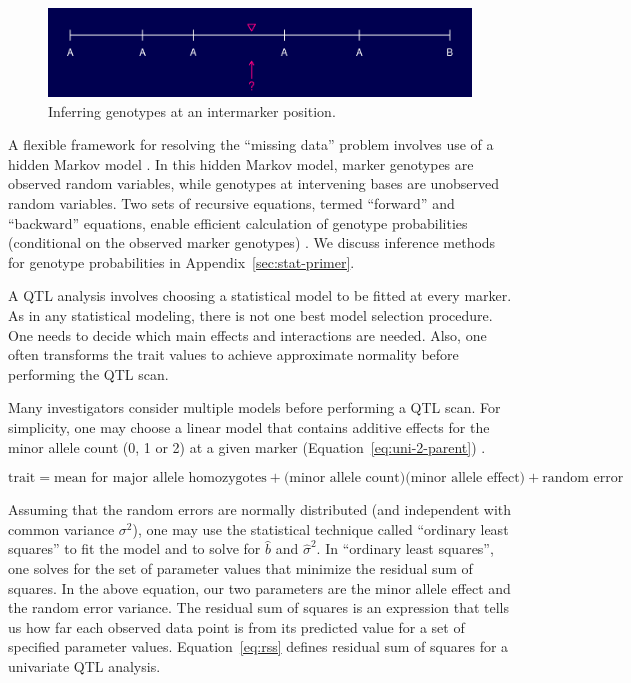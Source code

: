 \documentclass[oneside]{book}\usepackage[]{graphicx}\usepackage[]{color}
\begin{document}
\begin{figure}
\includegraphics[width = \textwidth]{figs/genoprob1.pdf}
\caption{Inferring genotypes at an intermarker position.}\label{fig:genoprob1}
\end{figure}




A flexible framework for resolving the ``missing data'' problem involves use of a
hidden Markov model \citep{broman2009guide, broman2006use}. 
In this hidden Markov model, marker genotypes are observed random variables, 
while genotypes at intervening bases are unobserved random variables. 
Two sets of recursive equations, termed ``forward'' and ``backward'' equations,
enable efficient calculation of genotype probabilities
(conditional on the observed marker genotypes) \citep{baum1970maximization}.
We discuss inference methods for genotype probabilities in Appendix~\ref{sec:stat-primer}.




A QTL analysis involves choosing a statistical model to be fitted at every marker. 
As in any statistical modeling, there is not one best model selection procedure.
One needs to decide which main effects and interactions are needed.
Also, one often transforms the trait values to achieve approximate normality before performing the QTL scan. 

Many investigators consider multiple models before performing a QTL scan.
For simplicity, one may choose a linear model that contains additive effects for
the  minor allele count (0, 1 or 2) at a given marker (Equation~\ref{eq:uni-2-parent}) \citep{martinez1992estimating,haley1992simple}.

\begin{equation}
\text{trait} = \text{mean for major allele homozygotes} + \text{(minor allele count)}\text{(minor allele effect)} + \text{random error}
\label{eq:uni-2-parent}
\end{equation}

Assuming that the random errors are normally distributed (and independent with common
variance $\sigma^2$), one may use the statistical technique called ``ordinary least squares''
to fit the model and to solve for $\hat b$ and $\hat \sigma^2$.
In ``ordinary least squares'', one solves for the set of parameter values that
minimize the residual sum of squares.
In the above equation, our two parameters are the minor allele effect and
the random error variance. The residual sum of squares is an expression that
tells us how far each observed data point is from its predicted value for a
set of specified parameter values. Equation~\ref{eq:rss} defines residual
sum of squares for a univariate QTL analysis.
\end{document}
